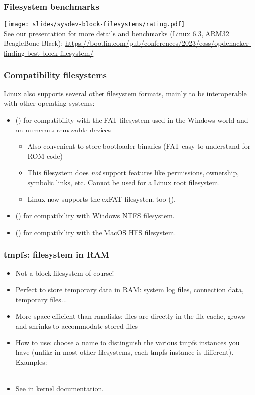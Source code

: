\begin{frame}
  \frametitle{Filesystem benchmarks}
  \texttt{[image: slides/sysdev-block-filesystems/rating.pdf]}\\
  \small
  See our presentation for more details and benchmarks (Linux 6.3, ARM32 BeagleBone Black):
  \scriptsize
  \url{https://bootlin.com/pub/conferences/2023/eoss/opdenacker-finding-best-block-filesystem/}
\end{frame}

\begin{frame}
  \frametitle{Compatibility filesystems}
  Linux also supports several other filesystem formats, mainly to be
  interoperable with other operating systems:
  \begin{itemize}
  \item {} () for compatibility with the FAT filesystem used in
    the Windows world and on numerous removable devices
    \begin{itemize}
    \item Also convenient to store bootloader binaries (FAT easy
      to understand for ROM code)
    \item This filesystem does {\em not} support features like
      permissions, ownership, symbolic links, etc. Cannot be used for
      a Linux root filesystem.
    \item Linux now supports the exFAT filesystem too ().
    \end{itemize}
  \item {} () for compatibility with
      Windows NTFS filesystem.
  \item {} () for compatibility with the
      MacOS HFS filesystem.
  \end{itemize}
\end{frame}

\begin{frame}
  \frametitle{tmpfs: filesystem in RAM}
  \begin{itemize}
  \item Not a block filesystem of course!
  \item Perfect to store temporary data in RAM: system log files,
    connection data, temporary files...
  \item More space-efficient than ramdisks: files are directly in the
    file cache, grows and shrinks to accommodate stored files
  \item How to use: choose a name to distinguish the various tmpfs
    instances you have (unlike in most other filesystems, each
    tmpfs instance is different). Examples:\\
    \\
  \item See  in kernel documentation.
  \end{itemize}
\end{frame}

